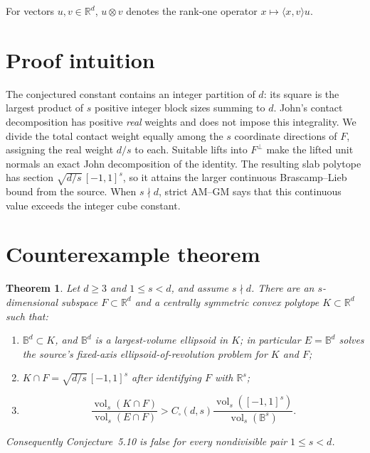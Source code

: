 \documentclass[11pt]{article}
\newtheorem{theorem}{Theorem}
\newcommand{\R}{\mathbb R}
\newcommand{\B}{\mathbb B}
\newcommand{\vol}{\operatorname{vol}}
\begin{document}
For vectors \(u,v\in\R^d\), \(u\otimes v\) denotes the rank-one operator
\(x\mapsto\langle x,v\rangle u\).

\section*{Proof intuition}

The conjectured constant contains an integer partition of \(d\): its square
is the largest product of \(s\) positive integer block sizes summing to
\(d\).  John's contact decomposition has positive \emph{real} weights and
does not impose this integrality.  We divide the total contact weight equally
among the \(s\) coordinate directions of \(F\), assigning the real weight
\(d/s\) to each.  Suitable lifts into \(F^\perp\) make the lifted unit normals
an exact John decomposition of the identity.  The resulting slab polytope
has section
\(\sqrt{d/s}\,[-1,1]^s\), so it attains the larger continuous
Brascamp--Lieb bound from the source.  When \(s\nmid d\), strict AM--GM says
that this continuous value exceeds the integer cube constant.

\section*{Counterexample theorem}

\begin{theorem}\label{thm:counterexample}
Let \(d\geq3\) and \(1\leq s<d\), and assume \(s\nmid d\).  There are an
\(s\)-dimensional subspace \(F\subset\R^d\) and a centrally symmetric
convex polytope \(K\subset\R^d\) such that:
\begin{enumerate}
\item \(\B^d\subset K\), and \(\B^d\) is a largest-volume ellipsoid in
      \(K\); in particular \(E=\B^d\) solves the source's fixed-axis
      ellipsoid-of-revolution problem for \(K\) and \(F\);
\item \(K\cap F=\sqrt{d/s}\,[-1,1]^s\) after identifying \(F\) with
      \(\R^s\);
\item
\[
 \frac{\vol_s(K\cap F)}{\vol_s(E\cap F)}
 > C_{\square}(d,s)
 \frac{\vol_s([-1,1]^s)}{\vol_s(\B^s)}.
\]
\end{enumerate}
Consequently Conjecture~5.10 is false for every nondivisible pair
\(1\leq s<d\).
\end{theorem}
\end{document}
